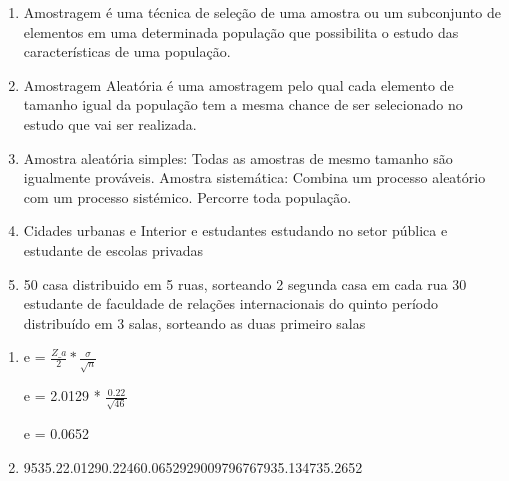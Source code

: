 
 \begin{question}
       
    \begin{enumerate}[label={\textbf{\alph*)}}]

        \item 
        
        Amostragem é uma técnica de seleção de uma amostra ou um subconjunto de elementos em uma determinada
        população que possibilita o estudo das características de uma população.
        \item 
        
        Amostragem Aleatória é uma amostragem pelo qual cada elemento de tamanho igual da
        população tem a mesma chance de ser selecionado no estudo que vai ser realizada.
        \item 
        
        Amostra aleatória simples: Todas as amostras de mesmo tamanho são igualmente prováveis.
        Amostra sistemática: Combina um processo aleatório com um processo sistémico. Percorre toda população.
        \item 
        
        Cidades urbanas e Interior e estudantes estudando no setor pública e estudante de escolas privadas
        \item 
        
        50 casa distribuido em 5 ruas, sorteando 2 segunda casa em cada rua
        30 estudante de faculdade de relações internacionais do quinto período distribuído em 3 salas, sorteando as duas
        primeiro salas

    \end{enumerate}
\end{question}


\begin{question}
    
    \begin{enumerate}[label={\textbf{\alph*)}}]

        \item
              e = $\frac{Z\_a}{2} * \frac{\sigma}{\sqrt{n}}$ 
        
              e = 2.0129 * $\frac{0.22}{\sqrt{46}}$

              e = 0.0652

        \item  
              
              \begin{formula1}
                {95}{35.2}{2.0129}{0.22}{46}{0.06529290097967679}{35.1347}{35.2652}
              \end{formula1}

    \end{enumerate}
\end{question}

